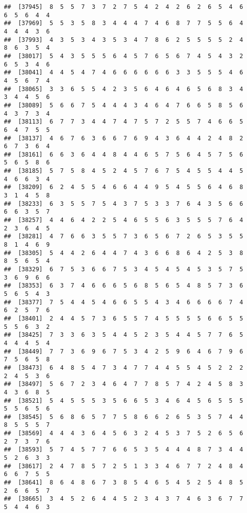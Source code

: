 \documentclass[
]{book}
\begin{document}
\begin{verbatim}
##  [37945]  8  5  5  7  3  7  2  7  5  4  2  4  2  6  2  6  5  4  6  6  5  6  4  4
##  [37969]  5  5  3  5  8  3  4  4  4  7  4  6  8  7  7  5  5  6  4  4  4  4  3  6
##  [37993]  4  3  5  3  4  3  5  3  4  7  8  6  2  5  5  5  5  2  4  8  6  3  5  4
##  [38017]  5  4  3  5  5  5  6  4  5  7  6  5  6  7  4  5  4  3  2  6  5  3  4  6
##  [38041]  4  4  5  4  7  4  6  6  6  6  6  6  3  3  5  5  5  4  6  4  5  6  7  4
##  [38065]  3  3  6  5  5  4  2  3  5  6  4  6  4  6  5  6  8  3  4  3  4  4  5  6
##  [38089]  5  6  6  7  5  4  4  4  3  4  6  4  7  6  6  5  8  5  6  4  3  7  3  4
##  [38113]  6  7  7  3  4  4  7  4  7  5  7  2  5  5  7  4  6  6  5  6  4  7  5  5
##  [38137]  4  6  7  6  3  6  6  7  6  9  4  3  6  4  4  2  4  8  2  6  7  3  6  4
##  [38161]  6  6  3  6  4  4  8  4  4  6  5  7  5  6  4  5  7  5  6  5  6  5  8  6
##  [38185]  5  7  5  8  4  5  2  4  5  7  6  7  5  4  5  5  4  4  5  4  6  6  3  4
##  [38209]  6  2  4  5  5  4  6  6  4  4  9  5  4  5  5  6  4  6  8  3  1  4  5  8
##  [38233]  6  3  5  5  7  5  4  3  7  5  3  3  7  6  4  3  5  6  6  6  6  3  5  7
##  [38257]  4  4  6  4  2  2  5  4  6  5  5  6  3  5  5  5  7  6  4  2  3  6  4  5
##  [38281]  4  7  6  6  3  5  5  7  3  6  5  6  7  2  6  5  3  5  5  8  1  4  6  9
##  [38305]  5  4  4  2  6  4  4  7  4  3  6  6  8  6  4  2  5  3  8  8  5  6  5  4
##  [38329]  6  7  5  3  6  6  7  5  3  4  5  4  5  4  5  3  5  7  5  3  6  9  6  6
##  [38353]  6  3  7  4  6  6  6  5  6  8  5  6  5  4  8  5  7  3  6  5  6  5  4  3
##  [38377]  7  5  4  4  5  4  6  6  5  5  4  3  4  6  6  6  6  7  4  6  2  5  7  6
##  [38401]  2  4  4  5  7  3  6  5  5  7  4  5  5  5  5  6  6  5  5  5  5  6  3  2
##  [38425]  7  3  3  6  3  5  4  4  5  2  3  5  4  4  5  7  7  6  5  4  4  4  5  4
##  [38449]  7  7  3  6  9  6  7  5  3  4  2  5  9  6  4  6  7  9  6  7  5  6  5  8
##  [38473]  6  4  8  5  4  7  3  4  7  7  4  4  5  5  4  5  2  2  2  2  4  5  3  6
##  [38497]  5  6  7  2  3  4  6  4  7  7  8  5  7  4  2  4  5  8  3  4  3  6  8  5
##  [38521]  5  4  5  5  5  3  5  6  6  5  3  4  6  4  5  6  5  5  5  5  5  6  5  6
##  [38545]  5  6  8  6  5  7  7  5  8  6  6  2  6  5  3  5  7  4  4  8  5  5  5  7
##  [38569]  4  4  4  3  6  4  5  6  3  2  4  5  3  7  5  2  6  5  6  2  7  3  7  6
##  [38593]  5  7  4  5  7  7  6  6  5  3  5  4  4  4  8  7  3  4  4  5  2  6  3  3
##  [38617]  2  4  7  8  5  7  2  5  1  3  3  4  6  7  7  2  4  8  4  6  6  7  5  5
##  [38641]  8  6  4  8  6  7  3  8  5  4  6  5  4  5  2  5  4  8  5  2  6  6  5  7
##  [38665]  3  4  5  2  6  4  4  5  2  3  4  3  7  4  6  3  6  7  7  5  4  4  6  3

\end{verbatim}
\end{document}
